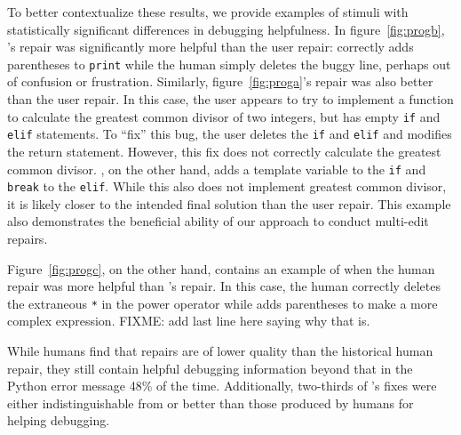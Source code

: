 To better contextualize these results, we provide examples of stimuli with
statistically significant differences in debugging helpfulness. 
In figure~\ref{fig:progb}, \toolname's repair was 
significantly more helpful than the user repair: 
 \toolname correctly adds parentheses to \texttt{print} 
while the human simply deletes the 
buggy line, perhaps out of confusion or frustration.
Similarly, figure~\ref{fig:proga}'s \toolname repair was also
better than the user repair. In this case, the user appears to try to
implement a function to calculate the greatest common divisor of two integers,
but has empty \texttt{if} and \texttt{elif} statements. 
To ``fix'' this bug, the user
deletes the \texttt{if} and \texttt{elif} and modifies the return statement.
However, this fix does not correctly calculate the greatest common divisor.
\toolname, on the other hand, adds a template variable to the \texttt{if} and 
\texttt{break} to the \texttt{elif}. While this also does not implement
greatest common divisor, it is likely closer to the intended final solution
than the user repair. This example also demonstrates the beneficial ability of our approach
to conduct multi-edit repairs. 

Figure~\ref{fig:progc}, on the other hand, contains an example of when the
human repair was more helpful than \toolname's repair. In this case, the
human correctly deletes the extraneous \texttt{*} in the power operator
while \toolname adds parentheses to make a more complex expression. 
FIXME: add last line here saying why that is.

\begin{framed}
  \noindent 
While humans find that \toolname repairs are 
of lower quality than the historical human repair, they still contain helpful 
debugging information beyond that in the Python error message 48\% of the time. 
Additionally, two-thirds of \toolname's fixes were either indistinguishable from
or better than those produced by humans for helping debugging.
\end{framed}
